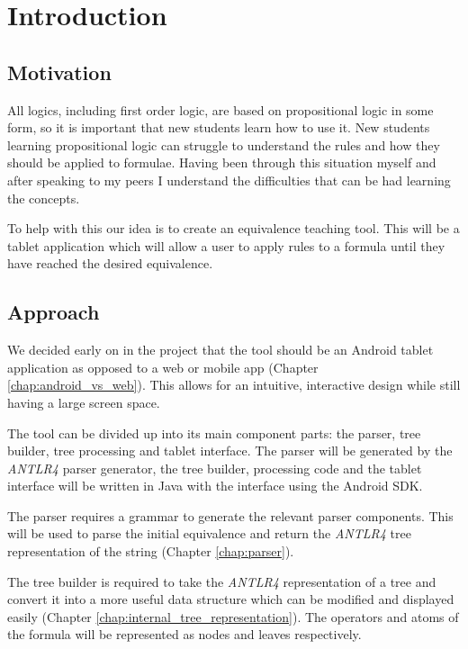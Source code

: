 \documentclass{report}
\begin{document}
\chapter{Introduction}

\section{Motivation}

All logics, including first order logic, are based on propositional logic in some form, so it is important that new students learn how to use it. New students learning propositional logic can struggle to understand the rules and how they should be applied to formulae. Having been through this situation myself and after speaking to my peers I understand the difficulties that can be had learning the concepts. 

To help with this our idea is to create an equivalence teaching tool. This will be a tablet application which will allow a user to apply rules to a formula until they have reached the desired equivalence.


\section{Approach}

We decided early on in the project that the tool should be an Android tablet application as opposed to a web or mobile app (Chapter \ref{chap:android_vs_web}). This allows for an intuitive, interactive design while still having a large screen space.

The tool can be divided up into its main component parts: the parser, tree builder, tree processing and tablet interface. The parser will be generated by the \emph{ANTLR4} parser generator, the tree builder, processing code and the tablet interface will be written in Java with the interface using the Android SDK.

The parser requires a grammar to generate the relevant parser components. This will be used to parse the initial equivalence and return the \emph{ANTLR4} tree representation of the string (Chapter \ref{chap:parser}).

The tree builder is required to take the \emph{ANTLR4} representation of a tree and convert it into a more useful data structure which can be modified and displayed easily (Chapter \ref{chap:internal_tree_representation}). The operators and atoms of the formula will be represented as nodes and leaves respectively.
\end{document}
